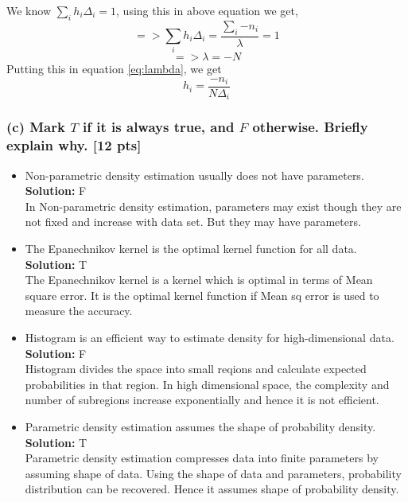 \documentclass[twoside,10pt]{article}
\begin{document}
We know $\sum_{i}{h_i \Delta_i} = 1$, using this in above equation we get,
$$
=> \sum_{i}{h_i \Delta_i} = \frac{\sum_{i}{-n_i}}{\lambda} = 1
$$
$$
=> \lambda = -N
$$
Putting this in equation \ref{eq:lambda}, we get
$$
\boxed{h_i = \frac{-n_i}{N \Delta_i}}
$$
\newpage

\subsubsection*{(c) Mark $T$ if it is always true, and $F$ otherwise. Briefly explain why. [12 pts]}

\begin{itemize}
  \item Non-parametric density estimation usually does not have parameters.\\
\textbf{ Solution: } F\\
In Non-parametric density estimation, parameters may exist though they are not fixed and increase with data set. But they may have parameters.
  \item The Epanechnikov kernel is the optimal kernel function for all data.\\
\textbf{ Solution: } T\\
The Epanechnikov kernel is a kernel which is optimal in terms of  Mean square error. It is the optimal kernel function if Mean sq error is used to measure the accuracy. 
  \item Histogram is an efficient way to estimate density for high-dimensional data.\\
\textbf{ Solution: } F\\
Histogram divides the space into small reqions and calculate expected probabilities in that region. In high dimensional space, the complexity and number of subregions increase exponentially and hence it is not efficient.
  \item Parametric density estimation assumes the shape of probability density.\\
\textbf{ Solution: } T\\
Parametric density estimation compresses data into finite parameters by assuming shape of data. Using the shape of data and parameters, probability distribution can be recovered. Hence it assumes shape of probability density.
\end{itemize}

\vspace{1cm}
\end{document}
